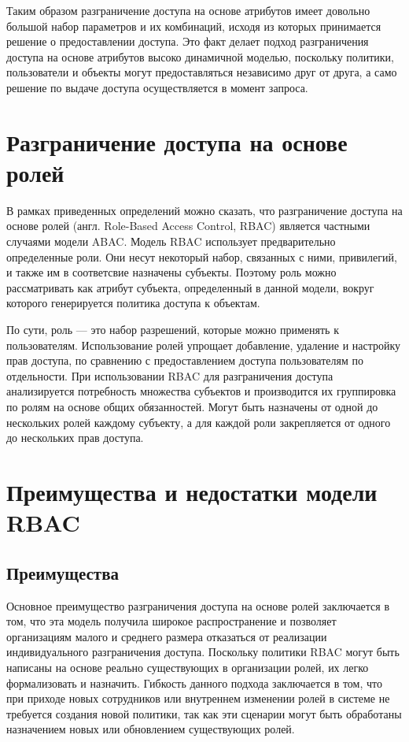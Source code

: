 \documentclass[a4paper,14pt]{article}
\begin{document}
Таким образом разграничение доступа на основе атрибутов имеет довольно большой набор параметров и их комбинаций, исходя из которых принимается решение о предоставлении доступа. Это факт делает подход разграничения доступа на основе атрибутов высоко динамичной моделью, поскольку политики, пользователи и объекты могут предоставляться независимо друг от друга, а само решение по выдаче доступа осуществляется в момент запроса. 



\section{Разграничение доступа на основе ролей}

В рамках приведенных определений можно сказать, что разграничение доступа на основе ролей (англ. Role-Based Access Control, RBAC) является частными случаями модели ABAC. Модель RBAC использует предварительно определенные роли. Они несут некоторый набор, связанных с ними, привилегий, и также им в соответсвие назначены субъекты. Поэтому роль можно рассматривать как атрибут субъекта, определенный в данной модели, вокруг которого генерируется политика доступа к объектам. 


По сути, роль — это набор разрешений, которые можно применять к пользователям. Использование ролей упрощает добавление, удаление и настройку прав доступа, по сравнению с предоставлением доступа пользователям по отдельности. При использовании RBAC для разграничения доступа анализируется потребность множества субъектов и производится их группировка по ролям на основе общих обязанностей. Могут быть назначены от одной до нескольких ролей каждому субъекту, а для каждой роли закрепляется от одного до нескольких прав доступа. 



\section{Преимущества и недостатки модели RBAC}

\subsection{Преимущества}

Основное преимущество разграничения доступа на основе ролей заключается в том, что эта модель получила широкое распространение и позволяет организациям малого и среднего размера отказаться от реализации индивидуального разграничения доступа. Поскольку политики RBAC могут быть написаны на основе реально существующих в организации ролей, их легко формализовать и назначить. Гибкость данного подхода заключается в том, что при приходе новых сотрудников или внутреннем изменении ролей в системе не требуется создания новой политики, так как эти сценарии могут быть обработаны назначением новых или обновлением существующих ролей. 
\end{document}
